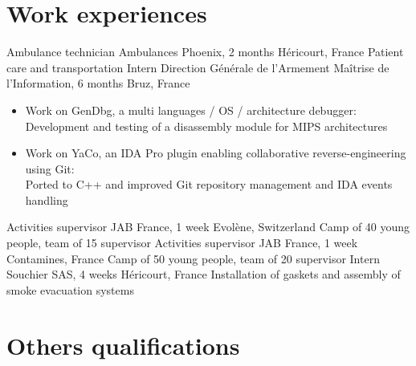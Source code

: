 \documentclass[10pt,a4paper,sans]{moderncv}
\begin{document}

	\vspace*{\deletedSpace}
	\section{Work experiences}
			{Ambulance technician}
			{Ambulances Phoenix, 2 months}
			{Héricourt, France}
			{Patient care and transportation}
			{}
			{Intern}
			{Direction Générale de l'Armement Maîtrise de l'Information, 6 months}
			{Bruz, France}
			{}
			{}
			\vspace{-5pt}
			\begin{itemize}
				\item Work on GenDbg, a multi languages / OS / architecture debugger:\\
					\phantom{=}Development and testing of a disassembly module for MIPS architectures
				\item Work on YaCo, an IDA Pro plugin enabling collaborative reverse-engineering using Git:\\
					\phantom{=}Ported to C++ and improved Git repository management and IDA events handling
			\end{itemize}
			\vspace{5pt}
			{Activities supervisor}
			{JAB France, 1 week}
			{Evolène, Switzerland}
			{Camp of 40 young people, team of 15 supervisor}
			{}
			{Activities supervisor}
			{JAB France, 1 week}
			{Contamines, France}
			{Camp of 50 young people, team of 20 supervisor}
			{}
			{Intern}
			{Souchier SAS, 4 weeks}
			{Héricourt, France}
			{Installation of gaskets and assembly of smoke evacuation systems}
			{}

	\newpage


	\vspace*{\deletedSpace}
	\section{Others qualifications}
\end{document}
